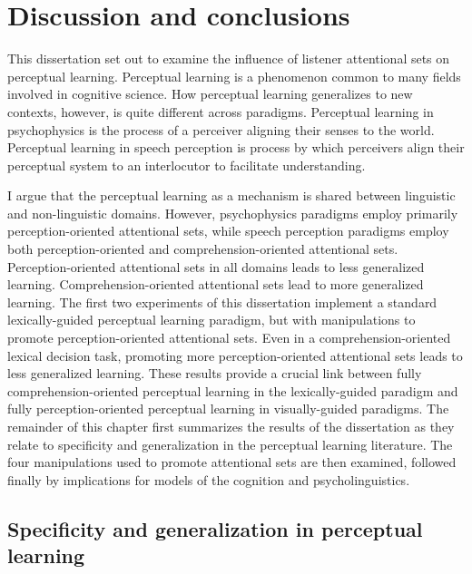 
\chapter{Discussion and conclusions}
\label{chap:conclusion}

This dissertation set out to examine the influence of listener attentional sets on perceptual learning.
Perceptual learning is a phenomenon common to many fields involved in cognitive science.
How perceptual learning generalizes to new contexts, however, is quite different across paradigms.
Perceptual learning in psychophysics is the process of a perceiver aligning their senses to the world.
Perceptual learning in speech perception is process by which perceivers align their perceptual system to an interlocutor to facilitate understanding.

I argue that the perceptual learning as a mechanism is shared between linguistic and non-linguistic domains.
However, psychophysics paradigms employ primarily perception-oriented attentional sets, while speech perception paradigms employ both perception-oriented and comprehension-oriented attentional sets.
Perception-oriented attentional sets in all domains leads to less generalized learning.
Comprehension-oriented attentional sets lead to more generalized learning.
The first two experiments of this dissertation implement a standard lexically-guided perceptual learning paradigm, but with manipulations to promote perception-oriented attentional sets.
Even in a comprehension-oriented lexical decision task, promoting more perception-oriented attentional sets leads to less generalized learning.
These results provide a crucial link between fully comprehension-oriented perceptual learning in the lexically-guided paradigm and fully perception-oriented perceptual learning in visually-guided paradigms.
The remainder of this chapter first summarizes the results of the dissertation as they relate to specificity and generalization in the perceptual learning literature.
The four manipulations used to promote attentional sets are then examined, followed finally by implications for models of the cognition and psycholinguistics.

\section{Specificity and generalization in perceptual learning}

